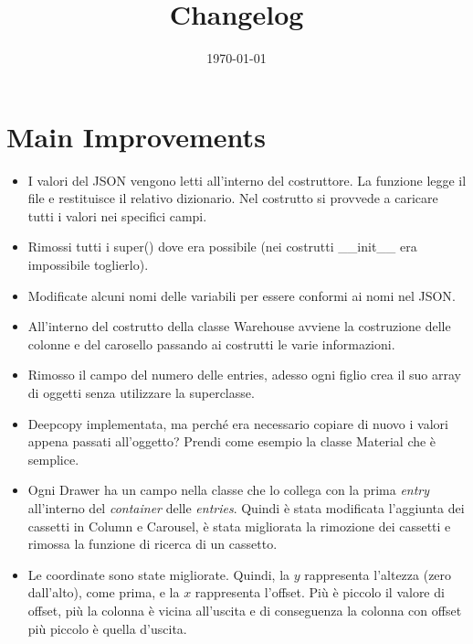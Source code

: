\documentclass[a4paper]{article}
\begin{document}
	\title{Changelog}
	\date{\today}
	\maketitle
	
	\newpage
	
	\section*{Main Improvements}
	
	\begin{itemize}[label=]
		\item I valori del \textsf{JSON} vengono letti all'interno del costruttore. La funzione legge il file e restituisce il relativo dizionario. Nel costrutto si provvede a caricare tutti i valori nei specifici campi.
		
		\item Rimossi tutti i \textsf{super()} dove era possibile (nei costrutti \textsf{\_\_init\_\_} era impossibile toglierlo).
		
		\item Modificate alcuni nomi delle variabili per essere conformi ai nomi nel \textsf{JSON}.
		
		\item All'interno del costrutto della classe \textsf{Warehouse} avviene la costruzione delle colonne e del carosello passando ai costrutti le varie informazioni.
		
		\item Rimosso il campo del numero delle entries, adesso ogni figlio crea il suo array di oggetti senza utilizzare la superclasse.
		
		\item \textsf{Deepcopy} implementata, ma perché era necessario copiare di nuovo i valori appena passati all'oggetto? Prendi come esempio la classe \textsf{Material} che è semplice.
		
		\item Ogni \textsf{Drawer} ha un campo nella classe che lo collega con la prima \emph{entry} all'interno del \emph{container} delle \emph{entries}. Quindi è stata modificata l'aggiunta dei cassetti in \textsf{Column} e \textsf{Carousel}, è stata migliorata la rimozione dei cassetti e rimossa la funzione di ricerca di un cassetto.
		
		\item Le coordinate sono state migliorate. Quindi, la $y$ rappresenta l'altezza (zero dall'alto), come prima, e la $x$ rappresenta l'offset. Più è piccolo il valore di offset, più la colonna è vicina all'uscita e di conseguenza la colonna con offset più piccolo è quella d'uscita.
		

\end{itemize}
\end{document}
